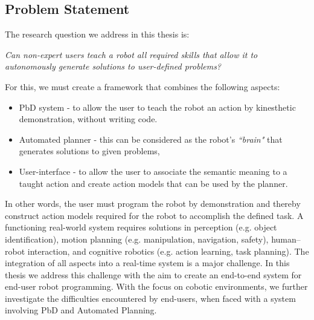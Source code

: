 \subsection{Problem Statement}
The research question we address in this thesis is:
\begin{center}
\textit{Can non-expert users teach a robot all required skills that allow it to autonomously generate solutions to user-defined problems?}
\end{center}
\noindent
For this, we must create a framework that combines the following aspects:
\begin{itemize}
	\item PbD system - to allow the user to teach the robot an action by kinesthetic demonstration, without writing code.
	\item Automated planner - this can be considered as the robot's \textit{``brain"} that generates solutions to given problems,
	\item User-interface - to allow the user to associate the semantic meaning to a taught action and create action models that can be used by the planner.
\end{itemize}

In other words, the user must program the robot by demonstration and thereby construct 
action models required for the robot to accomplish the defined task.
A functioning real-world system requires solutions in perception (e.g. object identification), motion planning (e.g. manipulation, navigation, safety), human–robot interaction, and cognitive robotics (e.g. action learning, task planning). 
The integration of all aspects into a real-time system is a major challenge.
In this thesis we address this challenge with the aim to create an end-to-end system for end-user robot programming.
With the focus on cobotic environments, we further investigate the difficulties encountered by end-users, when faced with a system involving PbD and Automated Planning. 

%

